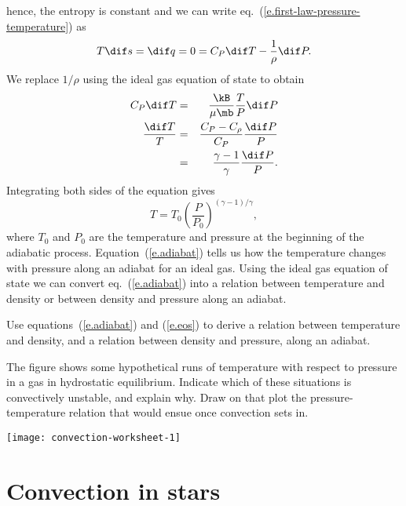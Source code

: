  hence, the entropy is constant and we can write eq.~(\ref{e.first-law-pressure-temperature}) as
\begin{equation}\label{e.differential-entropy}
    T\dif s = \dif q = 0 = C_{P}\dif T - \frac{1}{\rho} \dif P.
\end{equation}
We replace $1/\rho$ using the ideal gas equation of state
to obtain
\begin{eqnarray}
     C_{P}\dif T &=& \frac{\kB}{\mu\mb}\frac{T}{P}\dif P \nonumber\\
     \frac{\dif T}{T} &=& \frac{C_{P}-C_{\rho}}{C_{P}} \frac{\dif P}{P}\nonumber\\
	&=& \frac{\gamma-1}{\gamma}\frac{\dif P}{P}.
\label{e.differential-adiabat}
\end{eqnarray}
Integrating both sides of the equation gives
\begin{equation}\label{e.adiabat}
 T = T_{0}\left(\frac{P}{P_{0}}\right)^{(\gamma-1)/\gamma},
\end{equation}
where $T_{0}$ and $P_{0}$ are the temperature and pressure at the beginning of the adiabatic process. Equation~(\ref{e.adiabat}) tells us how the temperature changes with pressure along an adiabat for an ideal gas. Using the ideal gas equation of state we can convert eq.~(\ref{e.adiabat}) into a relation between temperature and density or between density and pressure along an adiabat.

\begin{exercisebox}
Use equations~(\ref{e.adiabat}) and (\ref{e.eos}) to derive a relation between temperature and density, and a relation between density and pressure, along an adiabat.
\end{exercisebox}

\begin{exercisebox}
The figure shows some hypothetical runs of temperature with respect to pressure in a gas in hydrostatic equilibrium.  Indicate which of these situations is convectively unstable, and explain why. Draw on that plot the pressure-temperature relation that would ensue once convection sets in.

\texttt{[image: convection-worksheet-1]}
\end{exercisebox}

\section{Convection in stars}
\label{s.convection-in-stars}

